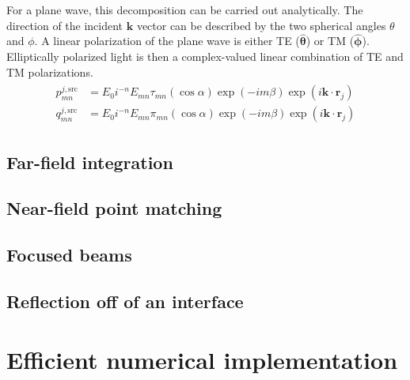 \documentclass[11pt]{article}
\begin{document}
For a plane wave, this decomposition can be carried out analytically.
The direction of the incident $\bm{k}$ vector can be described by the two spherical angles $\theta$ and $\phi$.
A linear polarization of the plane wave is either TE ($\bm{\hat \theta}$) or TM ($\bm{\hat \phi}$).
Elliptically polarized light is then a complex-valued linear combination of TE and TM polarizations.
\begin{align}
\begin{split}
p_{mn}^{j,\text{src}} &= E_0 i^{-n} E_{mn} \tau_{mn}(\cos \alpha) \exp(-im\beta) \exp(i\bm{k} \cdot \bm{r}_j) \\
q_{mn}^{j,\text{src}} &= E_0 i^{-n} E_{mn} \pi_{mn}(\cos \alpha) \exp(-im\beta) \exp(i\bm{k} \cdot \bm{r}_j)
\end{split}
\end{align}


\subsection{Far-field integration}
\subsection{Near-field point matching}
\subsection{Focused beams}

\subsection{Reflection off of an interface}

\section{Efficient numerical implementation}
\end{document}
